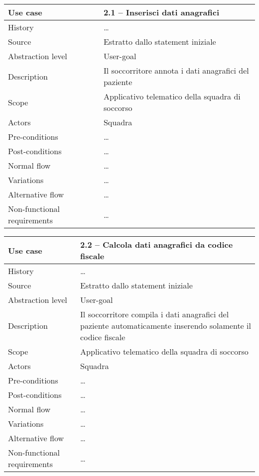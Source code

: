 \documentclass{article}
\begin{document}
    \begin{table}
        \begin{tabularx}{\textwidth}{l|X}
            Use case & 2.1 – Inserisci dati anagrafici\\
            \hline
            History & \dots \\
            Source & Estratto dallo statement iniziale\\
            Abstraction level & User-goal\\
            Description & Il soccorritore annota i dati anagrafici del paziente\\
            Scope & Applicativo telematico della squadra di soccorso\\
            Actors & Squadra\\
            Pre-conditions & \dots \\
            Post-conditions & \dots \\
            Normal flow & \dots \\
            Variations & \dots \\
            Alternative flow & \dots \\
            Non-functional requirements & \dots
        \end{tabularx}
        \label{tab:usecase2.1}
    \end{table}

    \begin{table}
        \begin{tabularx}{\textwidth}{l|X}
            Use case & 2.2 – Calcola dati anagrafici da codice fiscale\\
            \hline
            History & \dots \\
            Source & Estratto dallo statement iniziale\\
            Abstraction level & User-goal\\
            Description & Il soccorritore compila i dati anagrafici del paziente automaticamente inserendo solamente il codice fiscale\\
            Scope & Applicativo telematico della squadra di soccorso\\
            Actors & Squadra\\
            Pre-conditions & \dots \\
            Post-conditions & \dots \\
            Normal flow & \dots \\
            Variations & \dots \\
            Alternative flow & \dots \\
            Non-functional requirements & \dots
        \end{tabularx}
        \label{tab:usecase2.2}
    \end{table}
\end{document}
